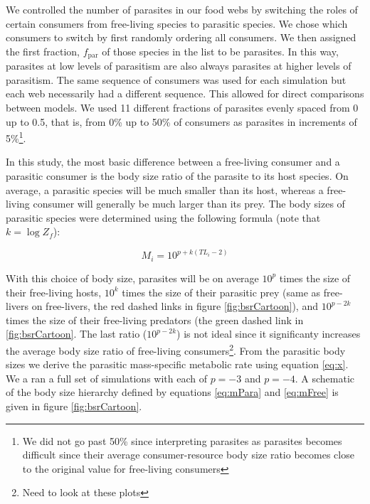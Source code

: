 \documentclass[11pt]{amsart}
\begin{document}
We controlled the number of parasites in our food webs by switching the roles of certain consumers from free-living species to parasitic species.  We chose which consumers to switch by first randomly ordering all consumers.  We then assigned the first fraction, $f_\text{par}$ of those species in the list to be parasites.  In this way, parasites at low levels of parasitism are also always parasites at higher levels of parasitism.  The same sequence of consumers was used for each simulation but each web necessarily had a different sequence.  This allowed for direct comparisons between models.  We used 11 different fractions of parasites evenly spaced from 0 up to 0.5, that is, from 0\% up to 50\% of consumers as parasites in increments of 5\%\footnote{We did not go past 50\% since interpreting parasites as parasites becomes difficult since their average consumer-resource body size ratio becomes close to the original value for free-living consumers}.

 In this study, the most basic difference between a free-living consumer and a parasitic consumer is the body size ratio of the parasite to its host species.  On average, a parasitic species will be much smaller than its host, whereas a free-living consumer will generally be much larger than its prey.  The body sizes of parasitic species were determined using the following formula (note that $k = \log Z_f$):

\begin{equation}
M_i = 10^{p + k(TL_i -2)} \label{eq:mPara}
\end{equation}

With this choice of body size, parasites will be on average $10^{p}$ times the size of their free-living hosts, $10^k$ times the size of their parasitic prey (same as free-livers on free-livers, the red dashed links in figure \ref{fig:bsrCartoon}), and $10^{p-2k}$ times the size of their free-living predators (the green dashed link in \ref{fig:bsrCartoon}.  The last ratio ($10^{p-2k}$) is not ideal since it significanty increases the average body size ratio of free-living consumers\footnote{Need to look at these plots}.  From the parasitic body sizes we derive the parasitic mass-specific metabolic rate using equation \eqref{eq:x}.  We a ran a full set of simulations with each of $p=-3$ and $p=-4$.  A schematic of the body size hierarchy defined by equations \eqref{eq:mPara} and \eqref{eq:mFree} is given in figure \ref{fig:bsrCartoon}.
\end{document}
